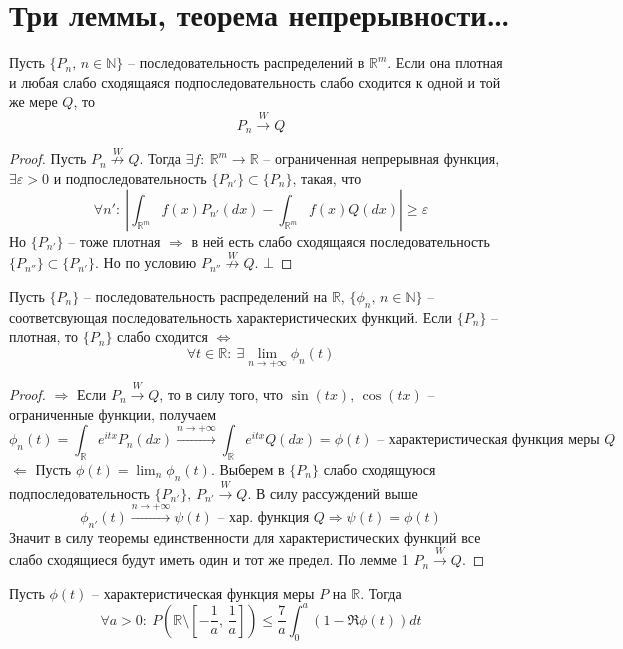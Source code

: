 \section{Три леммы, теорема непрерывности\dots}
\begin{lemma}
	Пусть $\{P_n,\, n \in \mathbb{N}\}$ -- последовательность распределений в $\mathbb{R}^m$. Если она плотная и любая слабо сходящаяся подпоследовательность слабо сходится к одной и той же мере $Q$, то
	\[P_n \stackrel{W}{\to} Q\]
\end{lemma}

\begin{proof}
	Пусть $P_n \stackrel{W}{\not\to} Q$. Тогда $\exists f:\: \mathbb{R}^m \to \mathbb{R}$ -- ограниченная непрерывная функция, $\exists \varepsilon > 0$ и подпоследовательность $\{P_{n'}\} \subset \{P_n\}$, такая, что
	\[\forall n' :\: \left|\int_{\mathbb{R}^m}f(x)P_{n'}(dx) - \int_{\mathbb{R}^m}f(x)Q(dx)\right| \geq \varepsilon\]
	Но $\{P_{n'}\}$ -- тоже плотная $\Rightarrow$ в ней есть слабо сходящаяся последовательность $\{P_{n''}\} \subset \{P_{n'}\}$. Но по условию $P_{n''} \stackrel{W}{\not\to} Q$. $\bot$
\end{proof}

\begin{lemma}
	Пусть $\{P_n\}$ -- последовательность распределений на $\mathbb{R},\, \{\phi_n,\, n \in \mathbb{N}\}$ -- соответсвующая последовательность характеристических функций. Если $\{P_n\}$ -- плотная, то $\{P_n\}$ слабо сходится $\Leftrightarrow$
	\[\forall t \in \mathbb{R} :\: \exists\lim_{n \to +\infty}\phi_n(t)\]
\end{lemma}

\begin{proof}
	$\Rightarrow$ Если $P_n \stackrel{W}{\to} Q$, то в силу того, что $\sin(tx),\,\cos(tx)$ -- ограниченные функции, получаем
	\[\phi_n(t) = \int_\mathbb{R}e^{itx}P_n(dx) \stackrel{n \to +\infty}{\to} \int_\mathbb{R}e^{itx}Q(dx) = \phi(t) \text{ -- характеристическая функция меры }Q\]
	$\Leftarrow$ Пусть $\phi(t) = \lim_n \phi_n(t)$. Выберем в $\{P_n\}$ слабо сходящуюся подпоследовательность $\{P_{n'}\},\, P_{n'} \stackrel{W}{\to} Q$. В силу рассуждений выше
	\[\phi_{n'}(t) \stackrel{n \to +\infty}{\to} \psi(t) \text{ -- хар. функция }Q \Rightarrow \psi(t) = \phi(t)\]
	Значит в силу теоремы единственности для характеристических функций все слабо сходящиеся будут иметь один и тот же предел. По лемме 1 $P_n \stackrel{W}{\to} Q$.
\end{proof}

\begin{lemma}
	Пусть $\phi(t)$ -- характеристическая функция меры $P$ на $\mathbb{R}$. Тогда
	\[\forall a > 0 :\: P\left(\mathbb{R} \setminus \left[-\frac{1}{a},\, \frac{1}{a}\right]\right) \leq \frac{7}{a} \int_0^a (1 - \Re\phi(t))dt\]
\end{lemma}

